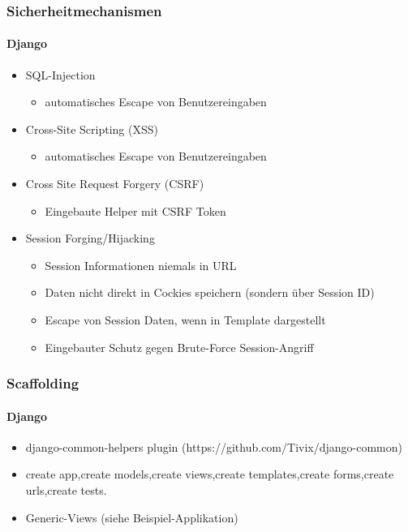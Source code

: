 \documentclass[
    t,
    smaller,
    compress,
    xcolor=svgnames,            %
    table,
]{beamer}
\begin{document}
\begin{frame}
  \frametitle{Sicherheitmechanismen}
\framesubtitle{Django}
  \begin{itemize}[<1->]
    \item SQL-Injection
    		\begin{itemize}[<1->]
    			\item automatisches Escape von Benutzereingaben
    		\end{itemize}
    \item Cross-Site Scripting (XSS)
    \begin{itemize}[<1->]
    			\item automatisches Escape von Benutzereingaben
    		\end{itemize}
    \item Cross Site Request Forgery (CSRF)
    	 \begin{itemize}[<1->]
    			\item Eingebaute Helper mit CSRF Token
    		\end{itemize}
    \item Session Forging/Hijacking
    \begin{itemize}[<1->]
    			\item Session Informationen niemals in URL
    			\item Daten nicht direkt in Cockies speichern (sondern \"uber Session ID)
    			\item Escape von Session Daten, wenn in Template dargestellt
    			\item Eingebauter Schutz gegen Brute-Force Session-Angriff
    		\end{itemize}
    \end{itemize}

\end{frame}


\begin{frame}[fragile]
  \frametitle{Scaffolding}
\framesubtitle{Django}
 \begin{itemize}[<1->]
    \item django-common-helpers plugin (https://github.com/Tivix/django-common)
    \item create app,create models,create views,create templates,create forms,create urls,create tests.
    \item Generic-Views (siehe Beispiel-Applikation)
 \end{itemize}
    \vspace{15pt}


\end{frame}
\end{document}
